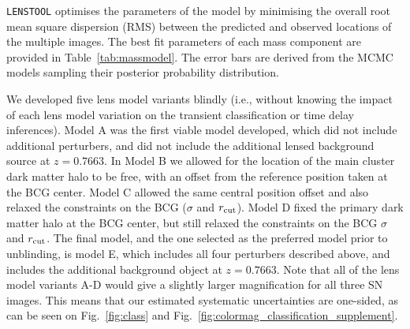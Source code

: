 \documentclass[12pt]{article}
\def\lenstool{{\tt LENSTOOL}\xspace}
\begin{document}
\lenstool optimises the parameters of the model by minimising the overall root mean square dispersion (RMS) between the predicted and observed locations of the multiple images. The best fit parameters of each mass component are provided in Table~\ref{tab:massmodel}. The error bars are derived from the MCMC models sampling their posterior probability distribution. 

We developed five lens model variants blindly (i.e., without knowing the impact of each lens model variation on the transient classification or time delay inferences). Model A was the first viable model developed, which did not include additional perturbers, and did not include the additional lensed background source at $z=0.7663$.   In Model B we allowed for the location of the main cluster dark matter halo to be free, with an offset from the reference position taken at the BCG center.  Model C allowed the same central position offset and also relaxed the constraints on the BCG ($\sigma$ and $r_{\rm cut}$).  Model D fixed the primary dark matter halo at the BCG center, but still relaxed the constraints on the BCG $\sigma$ and $r_{\rm cut}$.
The final model, and the one selected as the preferred model prior to unblinding, is model E, which includes all four perturbers described above, and includes the additional background object at $z=0.7663$.
Note that all of the lens model variants A-D would give a slightly larger magnification for all  three SN images.  This means that our estimated systematic uncertainties are one-sided, as can be seen on Fig.~\ref{fig:class} and Fig.~\ref{fig:colormag_classification_supplement}.
\end{document}
